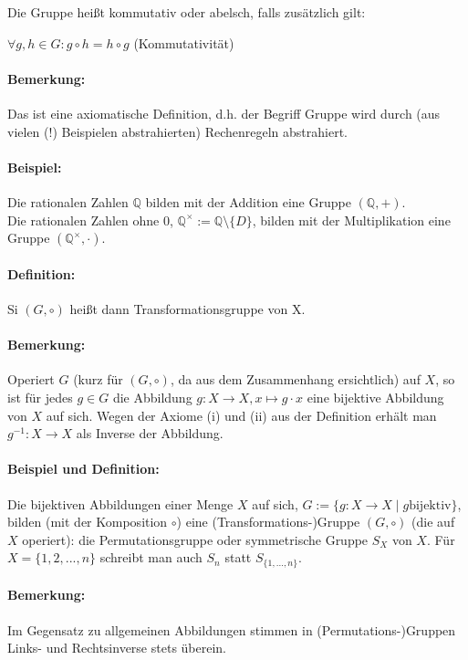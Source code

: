 \documentclass[12pt,a4paper,parskip=half-,DIV=15]{scrartcl}
\begin{document}
Die Gruppe heißt kommutativ oder abelsch, falls zusätzlich gilt:
\begin{center}$\forall g,h\in G: g\circ h = h\circ g$ (Kommutativität)\end{center}

\paragraph{Bemerkung:} Das ist eine axiomatische Definition, d.h. der Begriff \glqq Gruppe\grqq{} wird durch (aus vielen (!) Beispielen abstrahierten) \glqq Rechenregeln\grqq{} abstrahiert.
\paragraph{Beispiel:} Die rationalen Zahlen $\mathbb{Q}$ bilden mit der Addition eine Gruppe $(\mathbb{Q} ,+)$.\\
Die rationalen Zahlen ohne $0$, $\mathbb{Q}^{\times} := \mathbb{Q}\setminus \{D\}$, bilden mit der Multiplikation eine Gruppe $(\mathbb{Q}^\times ,\cdot)$.

\paragraph{Definition:} Si
$(G,\circ )$ heißt dann Transformationsgruppe von X.

\paragraph{Bemerkung:} Operiert $G$ (kurz für $(G,\circ )$, da aus dem Zusammenhang ersichtlich) auf $X$, so ist für jedes $g\in G$ die Abbildung $g:X\to X, x\mapsto g\cdot x$ eine bijektive Abbildung von $X$ auf sich. Wegen der Axiome (i) und (ii) aus der Definition erhält man $g^{-1}: X\to X$ als Inverse der Abbildung.
\paragraph{Beispiel und Definition:} Die bijektiven Abbildungen einer Menge $X$ auf sich, $G:= \{g:X\to X\mid g \text{bijektiv}\}$, bilden (mit der Komposition $\circ$) eine (Transformations-)Gruppe $(G,\circ )$ (die auf $X$ operiert): die Permutationsgruppe oder symmetrische Gruppe $S_X$ von $X$. Für $X=\{1,2,...,n\}$ schreibt man auch $S_n$ statt $S_{\{1,...,n\}}$.
\paragraph{Bemerkung:} Im Gegensatz zu allgemeinen Abbildungen stimmen in (Permutations-)Gruppen Links- und Rechtsinverse stets überein.
\end{document}
